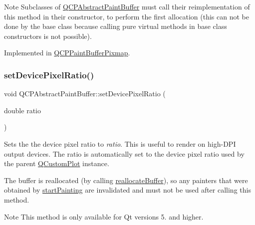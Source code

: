 \begin{DoxyNote}{Note}
Subclasses of \mbox{\hyperlink{class_q_c_p_abstract_paint_buffer}{Q\+C\+P\+Abstract\+Paint\+Buffer}} must call their reimplementation of this method in their constructor, to perform the first allocation (this can not be done by the base class because calling pure virtual methods in base class constructors is not possible). 
\end{DoxyNote}


Implemented in \mbox{\hyperlink{class_q_c_p_paint_buffer_pixmap_ad49f3205ba3463b1c44f8db3cfcc90f0}{Q\+C\+P\+Paint\+Buffer\+Pixmap}}.

\mbox{\label{class_q_c_p_abstract_paint_buffer_a555eaad5d5c806420ff35602a1bb68fa}} 
\subsubsection{\texorpdfstring{setDevicePixelRatio()}{setDevicePixelRatio()}}
{\footnotesize\ttfamily void Q\+C\+P\+Abstract\+Paint\+Buffer\+::set\+Device\+Pixel\+Ratio (\begin{DoxyParamCaption}\item[{double}]{ratio }\end{DoxyParamCaption})}

Sets the the device pixel ratio to {\itshape ratio}. This is useful to render on high-\/\+D\+PI output devices. The ratio is automatically set to the device pixel ratio used by the parent \mbox{\hyperlink{class_q_custom_plot}{Q\+Custom\+Plot}} instance.

The buffer is reallocated (by calling \mbox{\hyperlink{class_q_c_p_abstract_paint_buffer_aee7506a52bd7e5a07c2af27935eb13e7}{reallocate\+Buffer}}), so any painters that were obtained by \mbox{\hyperlink{class_q_c_p_abstract_paint_buffer_a9e9f29b19c033cf02fb96f1a148463f3}{start\+Painting}} are invalidated and must not be used after calling this method.

\begin{DoxyNote}{Note}
This method is only available for Qt versions 5. and higher. 
\end{DoxyNote}
\mbox{\label{class_q_c_p_abstract_paint_buffer_ae4c7dc70dfc66be2879ce297b2b3d67f}} 
